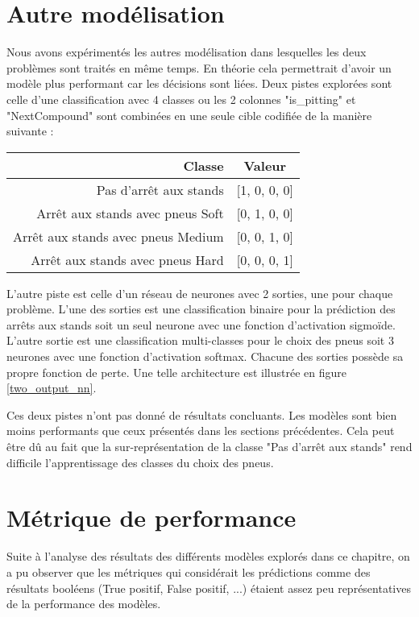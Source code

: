\section{Autre modélisation}
Nous avons expérimentés les autres modélisation dans lesquelles les deux problèmes sont traités en même temps.
En théorie cela permettrait d'avoir un modèle plus performant car les décisions sont liées.
Deux pistes explorées sont celle d'une classification avec 4 classes ou les 2 colonnes "is\_pitting" et "NextCompound" sont combinées en une seule cible
codifiée de la manière suivante :
\begin{table}[H]
    \begin{center}
        \begin{tabular}{r|c}
            Classe                             & Valeur       \\ \hline
            Pas d'arrêt aux stands             & [1, 0, 0, 0] \\
            Arrêt aux stands avec pneus Soft   & [0, 1, 0, 0] \\
            Arrêt aux stands avec pneus Medium & [0, 0, 1, 0] \\
            Arrêt aux stands avec pneus Hard   & [0, 0, 0, 1] \\
        \end{tabular}
    \end{center}
\end{table}

L'autre piste est celle d'un réseau de neurones avec 2 sorties, une pour chaque problème.
L'une des sorties est une classification binaire pour la prédiction des arrêts aux stands soit un seul neurone avec une fonction d'activation sigmoïde.
L'autre sortie est une classification multi-classes pour le choix des pneus soit 3 neurones avec une fonction d'activation softmax.
Chacune des sorties possède sa propre fonction de perte. Une telle architecture est illustrée en figure \ref{two_output_nn}.

Ces deux pistes n'ont pas donné de résultats concluants. Les modèles sont bien moins performants que ceux présentés dans les sections précédentes.
Cela peut être dû au fait que la sur-représentation de la classe "Pas d'arrêt aux stands" rend difficile l'apprentissage des classes du choix des pneus.

\section{Métrique de performance}
Suite à l'analyse des résultats des différents modèles explorés dans ce chapitre, on a pu observer que
les métriques qui considérait les prédictions comme des résultats booléens (True positif, False positif, ...) étaient assez peu représentatives de la performance des modèles.

